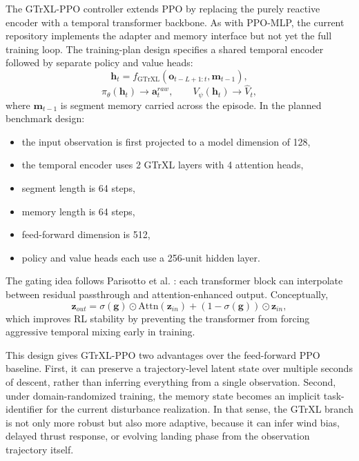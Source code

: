 \documentclass[10pt,twocolumn]{article}
\begin{document}
The GTrXL-PPO controller extends PPO by replacing the purely reactive encoder with a temporal transformer backbone. As with PPO-MLP, the current repository implements the adapter and memory interface but not yet the full training loop. The training-plan design specifies a shared temporal encoder followed by separate policy and value heads:
\begin{equation}
\mathbf{h}_t = f_{\mathrm{GTrXL}}(\mathbf{o}_{t-L+1:t}, \mathbf{m}_{t-1}),
\label{eq:gtrxl_hidden}
\end{equation}
\begin{equation}
\pi_{\theta}(\mathbf{h}_t)\rightarrow \mathbf{a}^{raw}_t,
\qquad
V_{\psi}(\mathbf{h}_t)\rightarrow \hat{V}_t,
\label{eq:gtrxl_heads}
\end{equation}
where $\mathbf{m}_{t-1}$ is segment memory carried across the episode. In the planned benchmark design:
\begin{itemize}
    \item the input observation is first projected to a model dimension of 128,
    \item the temporal encoder uses 2 GTrXL layers with 4 attention heads,
    \item segment length is 64 steps,
    \item memory length is 64 steps,
    \item feed-forward dimension is 512,
    \item policy and value heads each use a 256-unit hidden layer.
\end{itemize}

The gating idea follows Parisotto et al. \cite{parisotto2020}: each transformer block can interpolate between residual passthrough and attention-enhanced output. Conceptually,
\begin{equation}
\mathbf{z}_{out}
=
\sigma(\mathbf{g})\odot \mathrm{Attn}(\mathbf{z}_{in})
+
\left(1-\sigma(\mathbf{g})\right)\odot \mathbf{z}_{in},
\label{eq:gtrxl_gate}
\end{equation}
which improves RL stability by preventing the transformer from forcing aggressive temporal mixing early in training.

This design gives GTrXL-PPO two advantages over the feed-forward PPO baseline. First, it can preserve a trajectory-level latent state over multiple seconds of descent, rather than inferring everything from a single observation. Second, under domain-randomized training, the memory state becomes an implicit task-identifier for the current disturbance realization. In that sense, the GTrXL branch is not only more robust but also more adaptive, because it can infer wind bias, delayed thrust response, or evolving landing phase from the observation trajectory itself.
\end{document}
